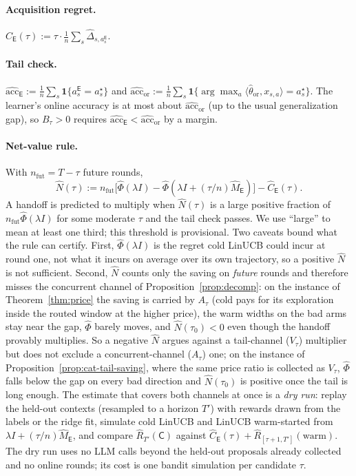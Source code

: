 \documentclass{article}
\theoremstyle{definition}
\theoremstyle{remark}
\newcommand{\ind}{\mathbf{1}}
\theoremstyle{remark}
\newcommand{\Cold}{\mathsf{C}}
\newcommand{\Exp}{\mathsf{E}}
\begin{document}
\paragraph{Acquisition regret.}
$\widehat C_{\Exp}(\tau):=\tau\cdot\frac1n\sum_s\widehat\Delta_{s,a_s^{\Exp}}$.

\paragraph{Tail check.} $\widehat{\mathrm{acc}}_{\Exp}:=\frac1n\sum_s\ind\{a_s^{\Exp}=a_s^\star\}$
and $\widehat{\mathrm{acc}}_{\mathrm{or}}:=\frac1n\sum_s\ind\{\arg\max_a\langle\widehat\theta_{\mathrm{or}},x_{s,a}\rangle=a_s^\star\}$.
The learner's online accuracy is at most about $\widehat{\mathrm{acc}}_{\mathrm{or}}$
(up to the usual generalization gap), so $B_\tau>0$ requires
$\widehat{\mathrm{acc}}_{\Exp}<\widehat{\mathrm{acc}}_{\mathrm{or}}$ by a margin.

\paragraph{Net-value rule.} With $n_{\mathrm{fut}}=T-\tau$ future rounds,
\[
\widehat N(\tau):=n_{\mathrm{fut}}\bigl[\widehat\Phi(\lambda I)-\widehat\Phi(\lambda I+(\tau/n)\widehat M_{\Exp})\bigr]-\widehat C_{\Exp}(\tau).
\]
A handoff is predicted to multiply when $\widehat N(\tau)$ is a large
positive fraction of $n_{\mathrm{fut}}\widehat\Phi(\lambda I)$ for some
moderate $\tau$ and the tail check passes. We use ``large'' to mean at least
one third; this threshold is provisional. Two caveats bound what the rule
can certify. First, $\widehat\Phi(\lambda I)$ is the regret cold LinUCB could
incur at round one, not what it incurs on average over its own trajectory,
so a positive $\widehat N$ is not sufficient. Second, $\widehat N$ counts only
the saving on \emph{future} rounds and therefore misses the concurrent
channel of Proposition~\ref{prop:decomp}: on the instance of
Theorem~\ref{thm:price} the saving is carried by $A_\tau$ (cold pays for its
exploration inside the routed window at the higher price), the warm widths on
the bad arms stay near the gap, $\widehat\Phi$ barely moves, and
$\widehat N(\tau_0)<0$ even though the handoff provably multiplies. So a
negative $\widehat N$ argues against a tail-channel ($V_\tau$) multiplier but
does not exclude a concurrent-channel ($A_\tau$) one; on the instance of
Proposition~\ref{prop:cat-tail-saving}, where the same price ratio is
collected as $V_\tau$, $\widehat\Phi$ falls below the gap on every bad
direction and $\widehat N(\tau_0)$ is positive once the tail is long enough.
The estimate that covers both channels at once is a \emph{dry run}: replay the
held-out contexts (resampled to a horizon $T'$) with rewards drawn from the
labels or the ridge fit, simulate cold LinUCB and LinUCB warm-started from
$\lambda I+(\tau/n)\widehat M_{\Exp}$, and compare
$\widehat R_{T'}(\Cold)$ against
$\widehat C_{\Exp}(\tau)+\widehat R_{[\tau+1,T']}(\mathrm{warm})$. The dry run
uses no LLM calls beyond the held-out proposals already collected and no
online rounds; its cost is one bandit simulation per candidate $\tau$.
\end{document}
